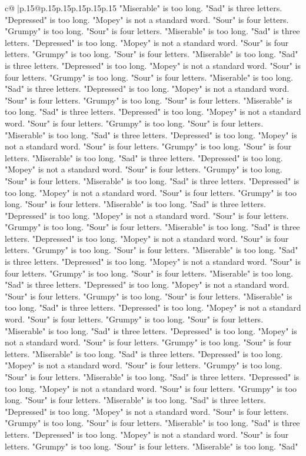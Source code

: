\documentclass{article}
\begin{document}
{\begin{supertabular}{c@{$\;$}|p{.15\linewidth}@{}p{.15\linewidth}p{.15\linewidth}p{.15\linewidth}p{.15\linewidth}p{.15\linewidth}}
{{{"Miserable" is too long. "Sad" is three letters. "Depressed" is too long. "Mopey" is not a standard word. "Sour" is four letters. "Grumpy" is too long. "Sour" is four letters. "Miserable" is too long. "Sad" is three letters. "Depressed" is too long. "Mopey" is not a standard word. "Sour" is four letters. "Grumpy" is too long. "Sour" is four letters. "Miserable" is too long. "Sad" is three letters. "Depressed" is too long. "Mopey" is not a standard word. "Sour" is four letters. "Grumpy" is too long. "Sour" is four letters. "Miserable" is too long. "Sad" is three letters. "Depressed" is too long. "Mopey" is not a standard word. "Sour" is four letters. "Grumpy" is too long. "Sour" is four letters. "Miserable" is too long. "Sad" is three letters. "Depressed" is too long. "Mopey" is not a standard word. "Sour" is four letters. "Grumpy" is too long. "Sour" is four letters. "Miserable" is too long. "Sad" is three letters. "Depressed" is too long. "Mopey" is not a standard word. "Sour" is four letters. "Grumpy" is too long. "Sour" is four letters. "Miserable" is too long. "Sad" is three letters. "Depressed" is too long. "Mopey" is not a standard word. "Sour" is four letters. "Grumpy" is too long. "Sour" is four letters. "Miserable" is too long. "Sad" is three letters. "Depressed" is too long. "Mopey" is not a standard word. "Sour" is four letters. "Grumpy" is too long. "Sour" is four letters. "Miserable" is too long. "Sad" is three letters. "Depressed" is too long. "Mopey" is not a standard word. "Sour" is four letters. "Grumpy" is too long. "Sour" is four letters. "Miserable" is too long. "Sad" is three letters. "Depressed" is too long. "Mopey" is not a standard word. "Sour" is four letters. "Grumpy" is too long. "Sour" is four letters. "Miserable" is too long. "Sad" is three letters. "Depressed" is too long. "Mopey" is not a standard word. "Sour" is four letters. "Grumpy" is too long. "Sour" is four letters. "Miserable" is too long. "Sad" is three letters. "Depressed" is too long. "Mopey" is not a standard word. "Sour" is four letters. "Grumpy" is too long. "Sour" is four letters. "Miserable" is too long. "Sad" is three letters. "Depressed" is too long. "Mopey" is not a standard word. "Sour" is four letters. "Grumpy" is too long. "Sour" is four letters. "Miserable" is too long. "Sad" is three letters. "Depressed" is too long. "Mopey" is not a standard word. "Sour" is four letters. "Grumpy" is too long. "Sour" is four letters. "Miserable" is too long. "Sad" is three letters. "Depressed" is too long. "Mopey" is not a standard word. "Sour" is four letters. "Grumpy" is too long. "Sour" is four letters. "Miserable" is too long. "Sad" is three letters. "Depressed" is too long. "Mopey" is not a standard word. "Sour" is four letters. "Grumpy" is too long. "Sour" is four letters. "Miserable" is too long. "Sad" is three letters. "Depressed" is too long. "Mopey" is not a standard word. "Sour" is four letters. "Grumpy" is too long. "Sour" is four letters. "Miserable" is too long. "Sad" is three letters. "Depressed" is too long. "Mopey" is not a standard word. "Sour" is four letters. "Grumpy" is too long. "Sour" is four letters. "Miserable" is too long. "Sad" }}}
\end{supertabular}}
\end{document}
